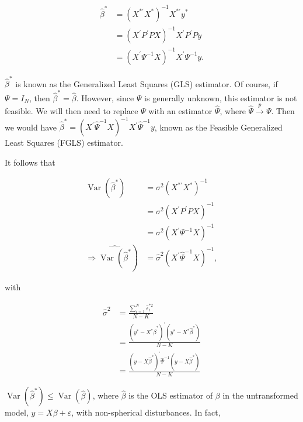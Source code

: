 $$
\begin{aligned}
\widehat{\beta}^{*} & =\left(X^{* \prime} X^{*}\right)^{-1} X^{* \prime} y^{*} \\
& =\left(X^{\prime} P^{\prime} P X\right)^{-1} X^{\prime} P^{\prime} P y \\
& =\left(X^{\prime} \Psi^{-1} X\right)^{-1} X^{\prime} \Psi^{-1} y .
\end{aligned}
$$

$\widehat{\beta}^{*}$ is known as the Generalized Least Squares (GLS) estimator. Of course, if $\Psi=I_{N}$, then $\widehat{\beta}^{*}=\widehat{\beta}$. However, since $\Psi$ is generally unknown, this estimator is not feasible. We will then need to replace $\Psi$ with an estimator $\widehat{\Psi}$, where $\widehat{\Psi} \xrightarrow{p} \Psi$. Then we would have $\widehat{\beta}^{*}=\left(X^{\prime} \widehat{\Psi}^{-1} X\right)^{-1} X^{\prime} \widehat{\Psi}^{-1} y$, known as the Feasible Generalized Least Squares (FGLS) estimator.

It follows that

$$
\begin{aligned}
\operatorname{Var}\left(\widehat{\beta}^{*}\right) & =\sigma^{2}\left(X^{* \prime} X^{*}\right)^{-1} \\
& =\sigma^{2}\left(X^{\prime} P^{\prime} P X\right)^{-1} \\
& =\sigma^{2}\left(X^{\prime} \Psi^{-1} X\right)^{-1} \\
\left.\Longrightarrow \widehat{\operatorname{Var}\left(\widehat{\beta}^{*}\right.}\right) & =\widehat{\sigma}^{2}\left(X^{\prime} \widehat{\Psi}^{-1} X\right)^{-1},
\end{aligned}
$$

with

$$
\begin{aligned}
\widehat{\sigma}^{2} & =\frac{\sum_{i=1}^{N} \widehat{\varepsilon}_{i}^{* 2}}{N-K} \\
& =\frac{\left(y^{*}-X^{*} \widehat{\beta}^{*}\right)^{\prime}\left(y^{*}-X^{*} \widehat{\beta}^{*}\right)}{N-K} \\
& =\frac{\left(y-X \widehat{\beta}^{*}\right)^{\prime} \widehat{\Psi}^{-1}\left(y-X \widehat{\beta}^{*}\right)}{N-K}
\end{aligned}
$$

$\operatorname{Var}\left(\widehat{\beta}^{*}\right) \leq \operatorname{Var}(\widehat{\beta})$, where $\widehat{\beta}$ is the OLS estimator of $\beta$ in the untransformed model, $y=X \beta+\varepsilon$, with non-spherical disturbances. In fact,

